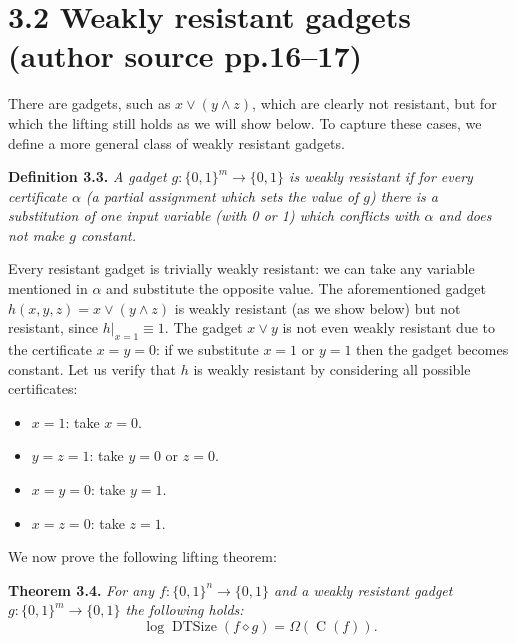 \documentclass[10pt,a4paper]{article}
\newcommand{\bits}{\{0,1\}}
\newcommand{\DTSize}{\operatorname{DTSize}}
\newcommand{\CC}{\operatorname C}
\newcommand{\comp}{\diamond}
\newenvironment{originalresult}[1]{\par\medskip\noindent\textbf{#1.}\itshape}{\par\medskip}
\begin{document}
\section*{3.2 Weakly resistant gadgets (author source pp.16--17)}
There are gadgets, such as $x\vee(y\wedge z)$, which are clearly not resistant, but for which the lifting still holds as we will show below. To capture these cases, we define a more general class of weakly resistant gadgets.
\begin{originalresult}{Definition 3.3}
A gadget $g:\bits^m\to\bits$ is weakly resistant if for every certificate $\alpha$ (a partial assignment which sets the value of $g$) there is a substitution of one input variable (with 0 or 1) which conflicts with $\alpha$ and does not make $g$ constant.
\end{originalresult}
Every resistant gadget is trivially weakly resistant: we can take any variable mentioned in $\alpha$ and substitute the opposite value. The aforementioned gadget $h(x,y,z)=x\vee(y\wedge z)$ is weakly resistant (as we show below) but not resistant, since $h|_{x=1}\equiv1$. The gadget $x\vee y$ is not even weakly resistant due to the certificate $x=y=0$: if we substitute $x=1$ or $y=1$ then the gadget becomes constant.
Let us verify that $h$ is weakly resistant by considering all possible certificates:
\begin{itemize}
\item $x=1$: take $x=0$.
\item $y=z=1$: take $y=0$ or $z=0$.
\item $x=y=0$: take $y=1$.
\item $x=z=0$: take $z=1$.
\end{itemize}
We now prove the following lifting theorem:
\begin{originalresult}{Theorem 3.4}
For any $f:\bits^n\to\bits$ and a weakly resistant gadget $g:\bits^m\to\bits$ the following holds:
\[\log\DTSize(f\comp g)=\Omega(\CC(f)).\]
\end{originalresult}
\end{document}
